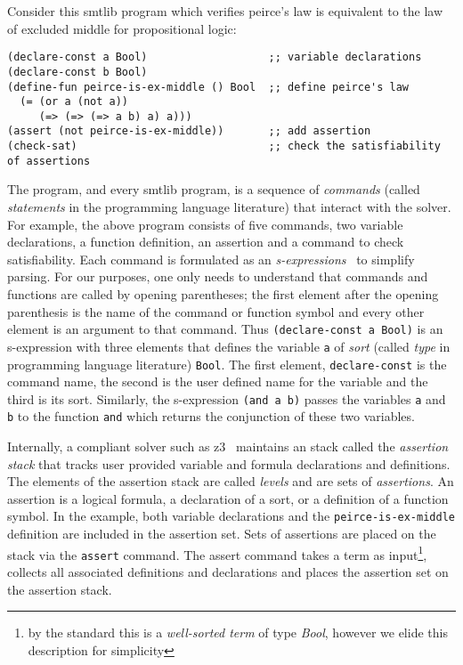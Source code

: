 Consider this \acl{smtlib} program
which verifies peirce's law is equivalent to the law of excluded middle for
propositional logic:
%
\begin{lstlisting}[columns=flexible,keepspaces=true,language=SMTLIB]
(declare-const a Bool)                   ;; variable declarations
(declare-const b Bool)
(define-fun peirce-is-ex-middle () Bool  ;; define peirce's law
  (= (or a (not a))
     (=> (=> (=> a b) a) a)))
(assert (not peirce-is-ex-middle))       ;; add assertion
(check-sat)                              ;; check the satisfiability of assertions
\end{lstlisting}
%
The program, and every \acl{smtlib} program, is a sequence of \emph{commands}
(called \emph{statements} in the programming language literature) that interact
with the solver. For example, the above program consists of five commands, two
variable declarations, a function definition, an assertion and a command to
check satisfiability. Each command is formulated as an
\emph{s-expressions}~\cite{10.1145/367177.367199} to simplify parsing. For our
purposes, one only needs to understand that commands and functions are called by
opening parentheses; the first element after the opening parenthesis is the name
of the command or function symbol and every other element is an argument to that
command. Thus \lstinline{(declare-const a Bool)} is an s-expression with three
elements that defines the \pl{} variable \lstinline{a} of \emph{sort} (called
\emph{type} in programming language literature) \lstinline{Bool}. The first
element, \lstinline{declare-const} is the command name, the second is the user
defined name for the variable and the third is its sort. Similarly, the
s-expression \lstinline{(and a b)} passes the variables \lstinline{a} and
\lstinline{b} to the function \lstinline{and} which returns the conjunction of
these two variables.

Internally, a compliant solver such as z3~\cite{10.1007/978-3-540-78800-3_24}
maintains an stack called the \emph{assertion stack} that tracks user provided
variable and formula declarations and definitions. The elements of the assertion
stack are called \emph{levels} and are sets of \emph{assertions}.
%
An assertion is a logical formula, a declaration of a sort, or a definition of a
function symbol. In the example, both variable declarations and the
\lstinline{peirce-is-ex-middle} definition are included in the assertion set.
Sets of assertions are placed on the stack via the \lstinline{assert} command.
The assert command takes a term as input\footnote{by the standard this is a
  \emph{well-sorted term} of type \emph{Bool}, however we elide this description
  for simplicity}, collects all associated definitions and declarations and
places the assertion set on the assertion stack.

